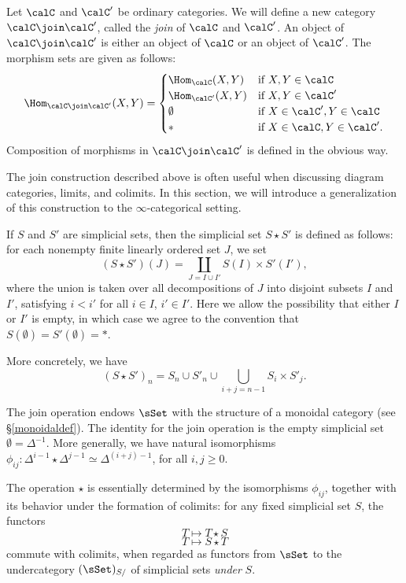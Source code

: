Let $\calC$ and $\calC'$ be ordinary categories. We will define a
new category $\calC \join \calC'$, called the {\it join} of $\calC$ and
$\calC'$. An object of $\calC \join \calC'$ is either an object of
$\calC$ or an object of $\calC'$. The morphism sets are given as follows:
 $$\Hom_{\calC \join \calC'}(X,Y) = \begin{cases} \Hom_{\calC}(X,Y) & \text{if } X,Y \in \calC \\
\Hom_{\calC'}(X,Y) & \text{if } X,Y \in \calC' \\
\emptyset & \text{if } X \in \calC', Y \in \calC \\
\ast & \text{if } X \in \calC, Y \in \calC'. \end{cases}$$
Composition of morphisms in $\calC \join \calC'$ is defined in the
obvious way. 

The join construction described above is often useful when discussing diagram categories, limits, and colimits. In this section, we will introduce a generalization of this construction to the $\infty$-categorical setting.

\begin{definition}
If $S$ and $S'$ are
simplicial sets, then the simplicial set $S \star S'$ is defined as
follows: for each nonempty finite linearly ordered set $J$, we set
$$(S \star S')(J) = \coprod_{J = I \cup I'} S(I) \times
S'(I'),$$ where the union is taken over all decompositions of $J$ into disjoint subsets $I$ and $I'$, satisfying $i < i'$ for all $i \in I$, $i' \in I'$. Here we allow the
possibility that either $I$ or $I'$ is empty, in which case we agree to
the convention that $S(\emptyset) = S'(\emptyset) = \ast$.
\end{definition}

More concretely, we have $$(S \star S')_{n} =
S_n \cup S'_n \cup \bigcup_{i+j = n-1} S_i \times S'_j.$$

The join operation endows $\sSet$ with the
structure of a monoidal category (see \S \ref{monoidaldef}).
The identity for the join operation is
the empty simplicial set $\emptyset = \Delta^{-1}$. More generally, we have
natural isomorphisms $\phi_{ij}: \Delta^{i-1} \star \Delta^{j-1} \simeq
\Delta^{(i+j)-1}$, for all $i, j \geq 0$.

\begin{remark}
The operation $\star$ is essentially determined by the isomorphisms
$\phi_{ij}$, together with its behavior under the formation of
colimits: for any fixed simplicial set $S$, the functors
$$ T \mapsto T \star S$$
$$ T \mapsto S \star T$$
commute with colimits, when regarded as functors from $\sSet$ to
the undercategory $(\sSet)_{S/}$ of simplicial sets {\em under} $S$.
\end{remark}

